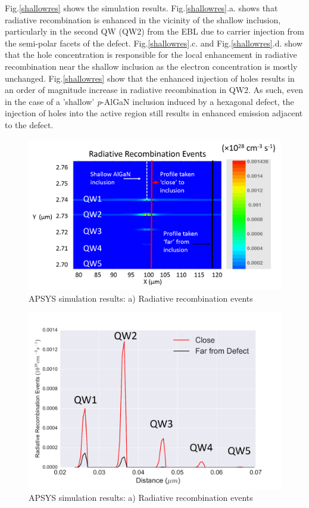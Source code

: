 Fig.\ref{shallowres} shows the simulation results. Fig.\ref{shallowres}.a. shows that radiative recombination is enhanced in the vicinity of the shallow inclusion, particularly in the second QW (QW2) from the EBL due to carrier injection from the semi-polar facets of the defect. Fig.\ref{shallowres}.c. and Fig.\ref{shallowres}.d. show that the hole concentration is responsible for the local enhancement in radiative recombination near the shallow inclusion as the electron concentration is mostly unchanged. Fig.\ref{shallowres} show that the enhanced injection of holes results in an order of magnitude increase in radiative recombination in QW2. As such, even in the case of a 'shallow' \textit{p}-AlGaN inclusion induced by a hexagonal defect, the injection of holes into the active region still results in enhanced emission adjacent to the defect.
\begin{figure}[h]
	\centering
	\includegraphics[width=1\textwidth]{Figs/Ch3/shallowrad1-1.png}
	\caption[h] {APSYS simulation results: a) Radiative recombination events}
	\label{shallow_big}
\end{figure}
\FloatBarrier 

\begin{figure}[h]
	\centering
	\includegraphics[width=1\textwidth]{Figs/Ch3/shallowrad.png}
	\caption[h] {APSYS simulation results: a) Radiative recombination events}
	\label{shallow_rad}
\end{figure}
\FloatBarrier 

